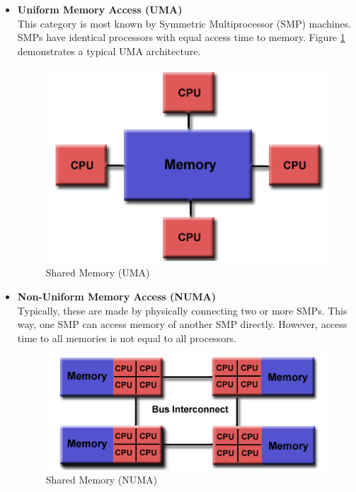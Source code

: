 \begin{itemize}
\item \textbf{Uniform Memory Access (UMA)}\\
  This category is most known by Symmetric Multiprocessor (SMP) machines. SMPs have identical processors with equal access time to memory. Figure \ref{fig:shared_memory_UMA} demonstrates a typical UMA architecture.\\

  \begin{figure}[ht]
    \centering
    \includegraphics[scale=0.6]{images/shared_mem.png}
    \caption{Shared Memory (UMA)}
    \label{fig:shared_memory_UMA}
  \end{figure}

\item \textbf{Non-Uniform Memory Access (NUMA)}\\
  Typically, these are made by physically connecting two or more SMPs. This way, one SMP can access memory of another SMP directly. However, access time to all memories is not equal to all processors.
  
  \begin{figure}[h!]
    \centering
    \includegraphics[scale=0.6]{images/numa.png}
    \caption{Shared Memory (NUMA)}
    \label{fig:shared_memory_NUMA}
  \end{figure}

\end{itemize}


